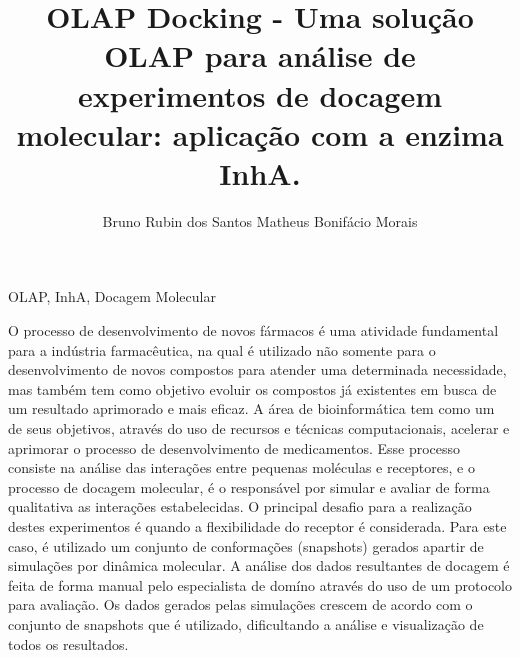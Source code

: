 \documentclass[portuguese,twoside]{pucrs-ppgcc}
\author{Bruno Rubin dos Santos Matheus Bonifácio Morais}
\title{OLAP Docking - Uma solução OLAP para análise de experimentos de docagem molecular: aplicação com a enzima I\MakeLowercase{nh}A.}
      {OLAP Docking - An OLAP solution to analyze molecular docking experiments: applied to I\MakeLowercase{nh}A enzyme.}
\begin{document}



%
%
%

\begin{resumo}{OLAP, InhA, Docagem Molecular}

O processo de desenvolvimento de novos fármacos é uma atividade fundamental para a indústria farmacêutica, na qual é utilizado não somente para o desenvolvimento de novos compostos para atender uma determinada necessidade, mas também tem como objetivo evoluir os compostos já existentes em busca de um resultado aprimorado e mais eficaz. A área de bioinformática tem como um de seus objetivos, através do uso de recursos e técnicas computacionais, acelerar e aprimorar o processo de desenvolvimento de medicamentos.
Esse processo consiste na análise das interações entre pequenas moléculas e receptores, e o processo de docagem molecular, é o responsável por simular e avaliar de forma qualitativa as interações estabelecidas.  O principal desafio para a realização destes experimentos é quando a flexibilidade do receptor é considerada. Para este caso, é utilizado um conjunto de conformações (snapshots) gerados apartir de simulações por dinâmica molecular.
A análise dos dados resultantes de docagem é feita de forma manual pelo especialista de domíno através do uso de um protocolo para avaliação. Os dados gerados pelas simulações crescem de acordo com o conjunto de snapshots que é utilizado, dificultando a análise e visualização de todos os resultados. 

\end{resumo}
\end{document}
